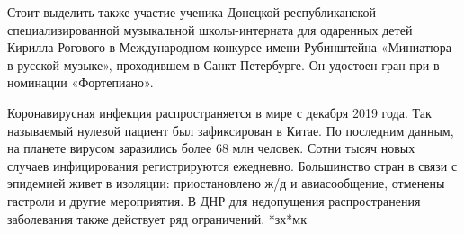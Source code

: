 Стоит выделить также участие ученика Донецкой республиканской
специализированной музыкальной школы-интерната для одаренных детей Кирилла
Рогового в Международном конкурсе имени Рубинштейна «Миниатюра в русской
музыке», проходившем в Санкт-Петербурге. Он удостоен гран-при в номинации
«Фортепиано».

Коронавирусная инфекция распространяется в мире с декабря 2019 года. Так
называемый нулевой пациент был зафиксирован в Китае. По последним данным, на
планете вирусом заразились более 68 млн человек. Сотни тысяч новых случаев
инфицирования регистрируются ежедневно. Большинство стран в связи с эпидемией
живет в изоляции: приостановлено ж/д и авиасообщение, отменены гастроли и
другие мероприятия. В ДНР для недопущения распространения заболевания также
действует ряд ограничений. *зх*мк
